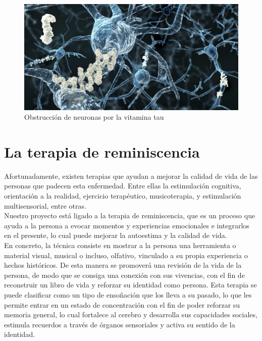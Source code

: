 \begin{figure}[h]
	\centering
	\includegraphics[width = 1 \textwidth]{Imagenes/Vectorial/proteina-tau.jpg}
	\caption{Obstrucción de neuronas por la vitamina tau}
	\label{fig:tau}
\end{figure}

\section{La terapia de reminiscencia}

Afortunadamente, existen terapias que ayudan a mejorar la calidad de vida de las personas que padecen esta enfermedad. Entre ellas la estimulación cognitiva, orientación a la realidad, ejercicio terapéutico, musicoterapia, y estimulación multisensorial, entre otras.\\
Nuestro proyecto está ligado a la terapia de reminiscencia, que es un proceso que ayuda a la persona a evocar momentos y experiencias emocionales e integrarlos en el presente, lo cual puede mejorar la autoestima y la calidad de vida.\\

En concreto, la técnica consiste en mostrar a la persona una herramienta o material visual, musical o incluso, olfativo, vinculado a su propia experiencia o hechos históricos. De esta manera se promoverá una revisión de la vida de la persona, de modo que se consiga una conexión con sus vivencias, con el fin de reconstruir un libro de vida y reforzar su identidad como persona.  Esta terapia se puede clasificar como un tipo de ensoñación que los lleva a su pasado, lo que les permite entrar en un estado de concentración con el fin de poder reforzar su memoria general, lo cual fortalece al cerebro y desarrolla sus capacidades sociales, estimula recuerdos a través de órganos sensoriales y activa su sentido de la identidad.\\


